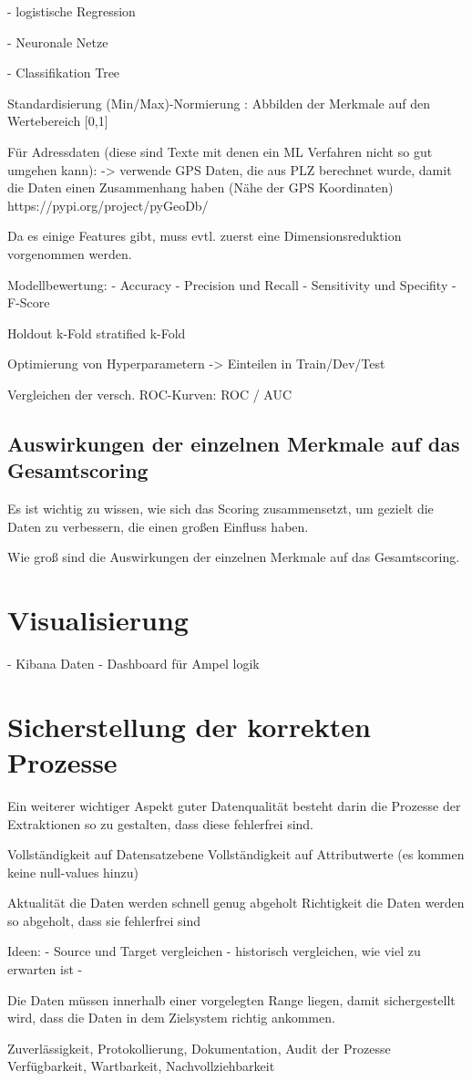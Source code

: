 - logistische Regression

- Neuronale Netze

- Classifikation Tree

Standardisierung
(Min/Max)-Normierung : Abbilden der Merkmale auf den Wertebereich [0,1]


Für Adressdaten (diese sind Texte mit denen ein ML Verfahren nicht so gut umgehen kann):
-> verwende GPS Daten, die aus PLZ berechnet wurde, damit die Daten einen Zusammenhang haben (Nähe der GPS Koordinaten)
https://pypi.org/project/pyGeoDb/

Da es einige Features gibt, muss evtl. zuerst eine Dimensionsreduktion vorgenommen werden.


Modellbewertung:
- Accuracy
- Precision und Recall
- Sensitivity und Specifity
- F-Score


Holdout
k-Fold
stratified k-Fold

Optimierung von Hyperparametern 
-> Einteilen in Train/Dev/Test

Vergleichen der versch. ROC-Kurven:
ROC / AUC

\subsection{Auswirkungen der einzelnen Merkmale auf das Gesamtscoring}
Es ist wichtig zu wissen, wie sich das Scoring zusammensetzt, um gezielt die Daten zu verbessern, die einen großen Einfluss haben. 



Wie groß sind die Auswirkungen der einzelnen Merkmale auf das Gesamtscoring. 

\section{Visualisierung}

- Kibana Daten
- Dashboard für Ampel logik

\section{Sicherstellung der korrekten Prozesse}
Ein weiterer wichtiger Aspekt guter Datenqualität besteht darin die Prozesse der Extraktionen so zu gestalten, dass diese fehlerfrei sind.

Vollständigkeit auf Datensatzebene
Vollständigkeit auf Attributwerte (es kommen keine null-values hinzu)


Aktualität die Daten werden schnell genug abgeholt
Richtigkeit die Daten werden so abgeholt, dass sie fehlerfrei sind

Ideen:
- Source und Target vergleichen
- historisch vergleichen, wie viel zu erwarten ist
- 

Die Daten müssen innerhalb einer vorgelegten Range liegen, damit sichergestellt wird, dass die Daten in dem Zielsystem richtig ankommen.



Zuverlässigkeit, Protokollierung, Dokumentation, Audit der Prozesse
 Verfügbarkeit, Wartbarkeit, Nachvollziehbarkeit



